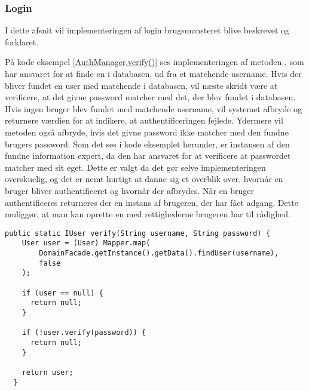 \documentclass[../../main.tex]{subfiles}
\begin{document}
\subsubsection{Login}

I dette afsnit vil implementeringen af login brugsmønsteret blive beskrevet og forklaret.

	På kode eksempel \ref{AuthManager.verify()} ses implementeringen af metoden , som har ansvaret for at finde en  i databasen, ud fra et matchende username. Hvis der bliver fundet en user med matchende  i databasen, vil næste skridt være at verificere, at det givne password matcher med det, der blev fundet i databasen. 
Hvis ingen bruger blev fundet med matchende username, vil systemet afbryde og returnere værdien  for at indikere, at authentificeringen fejlede. Ydermere vil metoden også afbryde, hvis det givne password ikke matcher med den fundne brugers password. Som det ses i kode eksemplet herunder, er instansen af den fundne  information expert, da den har ansvaret for at verificere at passwordet matcher med sit eget. Dette er valgt da det gør selve  implementeringen overskuelig, og det er nemt hurtigt at danne sig et overblik over, hvornår en bruger bliver authentificeret og hvornår der afbrydes.
Når en bruger authentificeres returneres der en instans af brugeren, der har fået adgang. Dette muliggør, at man kan oprette en  med rettighederne brugeren har til rådighed. \\

\begin{lstlisting}[caption=AuthManager.verify(), captionpos=b, label=AuthManager.verify()]
  public static IUser verify(String username, String password) {
    User user = (User) Mapper.map(
    	DomainFacade.getInstance().getData().findUser(username), 
        false
    );

    if (user == null) {
      return null;
    }

    if (!user.verify(password)) {
      return null;
    }

    return user;
  }
\end{lstlisting}
\end{document}
